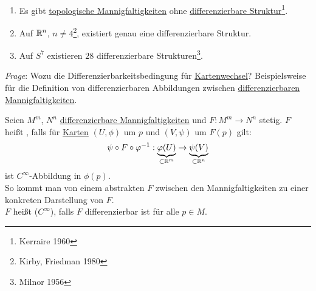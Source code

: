 \begin{remark}
  \
  \begin{enumerate}
    \item Es gibt \hyperref[def:topologischeMannigfaltigkeit]{topologische Mannigfaltigkeiten} ohne \hyperref[def:dbstruktur]{differenzierbare Struktur}\footnote{Kerraire 1960}.
    \item Auf $ \mathbb{R}^n $, $ n \neq 4 $\footnote{Kirby, Friedman 1980}, existiert genau eine differenzierbare Struktur.
    \item Auf $ S^7 $ existieren $ 28 $ differenzierbare Strukturen\footnote{Milnor 1956}.
  \end{enumerate}
  \emph{Frage}: Wozu die Differenzierbarkeitsbedingung für \hyperref[def:kartenwechsel]{Kartenwechsel}? Beispielsweise für die Definition von differenzierbaren Abbildungen zwischen \hyperref[def:dbmannigfaltigkeit]{differenzierbaren Mannigfaltigkeiten}.
\end{remark}


\begin{definition}[Differenzierbarkeit]
  Seien $ M^m $, $ N^n $ \hyperref[def:dbmannigfaltigkeit]{differenzierbare Mannigfaltigkeiten} und $ F: M^m \to N^n $ stetig. $ F $ heißt \label{def:differenzierbar}, falls für \hyperref[def:karte]{Karten} $ (U, \phi) $ um $ p $ und $ (V, \psi) $ um $ F(p) $ gilt:
  \begin{equation*}
    \psi \circ F \circ \varphi^{-1}: \underbrace{\varphi(U)}_{\subset \mathbb{R}^m} \to \underbrace{\psi(V)}_{\subset \mathbb{R}^n}
  \end{equation*}
  ist $ C^\infty $-Abbildung in $ \phi(p) $. \\
  So kommt man von einem abstrakten $ F $ zwischen den Mannigfaltigkeiten zu einer konkreten Darstellung von $ F $. \\
  $ F $ heißt \term{differenzierbar} ($ C^\infty $), falls $ F $ differenzierbar ist für alle $ p \in M $.
\end{definition}

